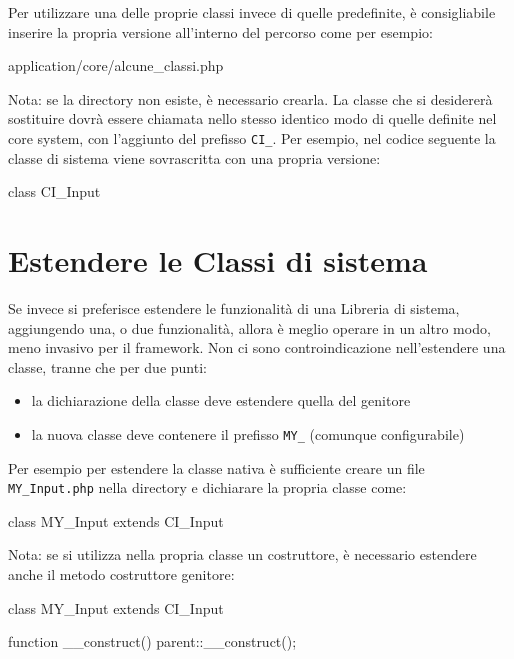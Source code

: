 Per utilizzare una delle proprie classi invece di quelle predefinite, è consigliabile inserire la propria versione all'interno del percorso  come per esempio:

\begin{code}
application/core/alcune_classi.php
\end{code}

Nota: se la directory non esiste, è necessario crearla. La classe che si desidererà sostituire dovrà essere chiamata nello stesso identico modo di quelle definite nel core system, con l'aggiunto del prefisso \verb|CI_|. Per esempio, nel codice seguente la classe di sistema  viene sovrascritta con una propria versione:

\begin{code}
class CI_Input {

}
\end{code}




\section{Estendere le Classi di sistema}

Se invece si preferisce estendere le funzionalità di una Libreria di sistema, aggiungendo una, o due funzionalità, allora è meglio operare in un altro modo, meno invasivo per il framework. Non ci sono controindicazione nell'estendere una classe, tranne che per due punti:

\begin{itemize}
\item la dichiarazione della classe deve estendere quella del genitore
\item la nuova classe deve contenere il prefisso \verb|MY_| (comunque configurabile)
\end{itemize}

Per esempio per estendere la classe nativa  è sufficiente creare un file \verb|MY_Input.php| nella directory  e dichiarare la propria classe come:

\begin{code}
class MY_Input extends CI_Input {

}
\end{code}

Nota: se si utilizza nella propria classe un costruttore, è necessario estendere anche il metodo costruttore genitore:

\begin{code}
class MY_Input extends CI_Input {

	function __construct() {
		parent::__construct();
    }
}
\end{code}


